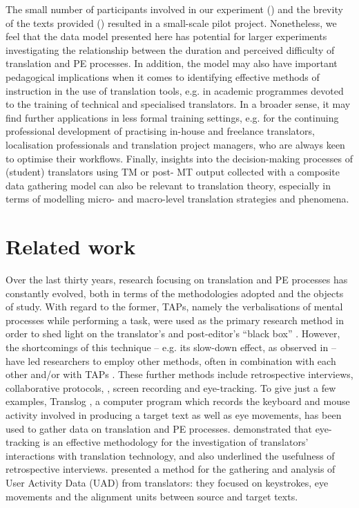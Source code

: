 \documentclass[output=paper]{LSP/langsci}
\begin{document}
The small number of participants involved in our experiment () and the brevity of the texts provided () resulted in a small-scale pilot project. Nonetheless, we feel that the data  model presented here has potential for larger experiments investigating the relationship between the duration and perceived difficulty of translation and PE processes. In addition, the model may also have important pedagogical implications when it comes to identifying effective methods of instruction in the use of translation tools, e.g. in academic programmes devoted to the training of technical and specialised translators. In a broader sense, it may find further applications in less formal training settings, e.g. for the continuing professional development of practising in-house and freelance translators, localisation professionals and translation project managers, who are always keen to optimise their workflows. Finally, insights into the decision-making processes of (student) translators using TM or post- MT output collected with a composite data gathering model can also be relevant to translation theory, especially in terms of modelling micro- and macro-level translation strategies and phenomena.

\section{Related work}\label{ressetti-gaspari:sec:2}

Over the last thirty years, research focusing on translation and PE processes has constantly evolved, both in terms of the methodologies adopted and the objects of study. With regard to the former, TAPs, namely the verbalisations of mental processes while performing a task, were used as the primary research method in order to shed light on the translator's and post-editor's ``black box'' \citep{Lorscher1991}. However, the shortcomings of this technique -- e.g. its slow-down effect, as observed in \citet{Jakobsen2003} -- have led researchers to employ other methods, often in combination with each other and/or with TAPs \citep{Angelone2010}. These further methods include retrospective interviews, collaborative protocols, , screen recording and eye-tracking. To give just a few examples, Translog \citep{Jakobsen1999Logging, Carl2012Translog}, a computer program which records the keyboard and mouse activity involved in producing a target text as well as eye movements, has been used to gather data on translation and PE processes.  demonstrated that eye-tracking is an effective methodology for the investigation of translators' interactions with translation technology, and also underlined the usefulness of retrospective interviews.  presented a method for the gathering and analysis of User Activity Data (UAD) from translators: they focused on keystrokes, eye movements and the alignment units between source and target texts.
\end{document}
